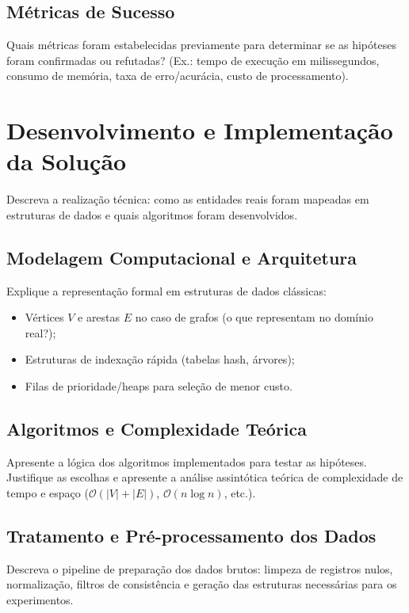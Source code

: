 \documentclass[11pt,a4paper]{article}
\begin{document}
\subsection{Métricas de Sucesso}
Quais métricas foram estabelecidas previamente para determinar se as hipóteses foram confirmadas ou refutadas? (Ex.: tempo de execução em milissegundos, consumo de memória, taxa de erro/acurácia, custo de processamento).

\section{Desenvolvimento e Implementação da Solução}

\begin{instrucao}
Descreva a realização técnica: como as entidades reais foram mapeadas em estruturas de dados e quais algoritmos foram desenvolvidos.
\end{instrucao}

\subsection{Modelagem Computacional e Arquitetura}
Explique a representação formal em estruturas de dados clássicas:
\begin{itemize}
    \item Vértices $V$ e arestas $E$ no caso de grafos (o que representam no domínio real?);
    \item Estruturas de indexação rápida (tabelas hash, árvores);
    \item Filas de prioridade/heaps para seleção de menor custo.
\end{itemize}

\subsection{Algoritmos e Complexidade Teórica}
Apresente a lógica dos algoritmos implementados para testar as hipóteses. Justifique as escolhas e apresente a análise assintótica teórica de complexidade de tempo e espaço ($\mathcal{O}(|V| + |E|)$, $\mathcal{O}(n \log n)$, etc.).

\subsection{Tratamento e Pré-processamento dos Dados}
Descreva o pipeline de preparação dos dados brutos: limpeza de registros nulos, normalização, filtros de consistência e geração das estruturas necessárias para os experimentos.
\end{document}
